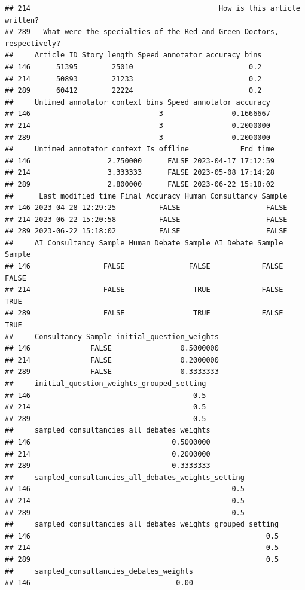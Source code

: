 \documentclass[
]{article}
\begin{document}
\begin{verbatim}
## 214                                            How is this article written?
## 289   What were the specialties of the Red and Green Doctors, respectively?
##     Article ID Story length Speed annotator accuracy bins
## 146      51395        25010                           0.2
## 214      50893        21233                           0.2
## 289      60412        22224                           0.2
##     Untimed annotator context bins Speed annotator accuracy
## 146                              3                0.1666667
## 214                              3                0.2000000
## 289                              3                0.2000000
##     Untimed annotator context Is offline            End time
## 146                  2.750000      FALSE 2023-04-17 17:12:59
## 214                  3.333333      FALSE 2023-05-08 17:14:28
## 289                  2.800000      FALSE 2023-06-22 15:18:02
##      Last modified time Final_Accuracy Human Consultancy Sample
## 146 2023-04-28 12:29:25          FALSE                    FALSE
## 214 2023-06-22 15:20:58          FALSE                    FALSE
## 289 2023-06-22 15:18:02          FALSE                    FALSE
##     AI Consultancy Sample Human Debate Sample AI Debate Sample Sample
## 146                 FALSE               FALSE            FALSE  FALSE
## 214                 FALSE                TRUE            FALSE   TRUE
## 289                 FALSE                TRUE            FALSE   TRUE
##     Consultancy Sample initial_question_weights
## 146              FALSE                0.5000000
## 214              FALSE                0.2000000
## 289              FALSE                0.3333333
##     initial_question_weights_grouped_setting
## 146                                      0.5
## 214                                      0.5
## 289                                      0.5
##     sampled_consultancies_all_debates_weights
## 146                                 0.5000000
## 214                                 0.2000000
## 289                                 0.3333333
##     sampled_consultancies_all_debates_weights_setting
## 146                                               0.5
## 214                                               0.5
## 289                                               0.5
##     sampled_consultancies_all_debates_weights_grouped_setting
## 146                                                       0.5
## 214                                                       0.5
## 289                                                       0.5
##     sampled_consultancies_debates_weights
## 146                                  0.00

\end{verbatim}
\end{document}
